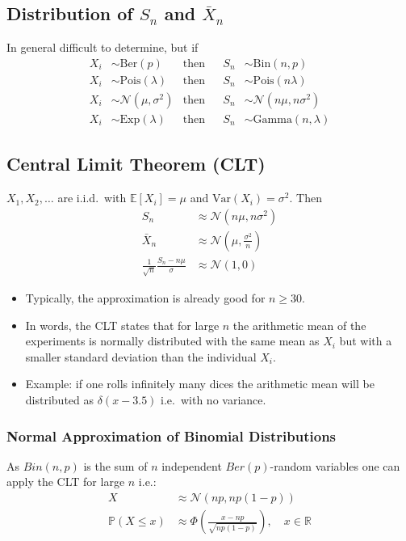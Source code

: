 \subsection[LLN Examples]{Distribution of $S_n$ and $\bar{X}_n$}
In general difficult to determine, but if
\noindent\begin{align*}
    X_i & \sim \mathrm{Ber}(p)            & \text{then} &  & S_n & \sim \mathrm{Bin}(n,p)            \\
    X_i & \sim \mathrm{Pois}(\lambda)     & \text{then} &  & S_n & \sim \mathrm{Pois}(n\lambda)      \\
    X_i & \sim \mathcal{N}(\mu, \sigma^2) & \text{then} &  & S_n & \sim \mathcal{N}(n\mu, n\sigma^2) \\
    X_i & \sim \mathrm{Exp}(\lambda)      & \text{then} &  & S_n & \sim \mathrm{Gamma}(n, \lambda)
\end{align*}

\subsection{Central Limit Theorem (CLT)}
$X_1, X_2, \ldots$ are i.i.d.\ with $\mathbb{E}[X_i]=\mu$ and $\mathrm{Var}(X_i)=\sigma^2$. Then
\begin{align*}
    S_n                                       & \approx \mathcal{N}(n\mu, n\sigma^2)         \\
    \bar{X}_n                                 & \approx \mathcal{N}(\mu, \frac{\sigma^2}{n}) \\
    \frac{1}{\sqrt{n}}\frac{S_n-n\mu}{\sigma} & \approx\mathcal{N}(1,0)
\end{align*}


\begin{itemize}
    \item Typically, the approximation is already good for $n \geq 30$.
    \item In words, the CLT states that for large $n$ the arithmetic mean of the experiments is normally distributed with the same mean as $X_i$ but with a smaller standard deviation than the individual $X_i$.
    \item Example: if one rolls infinitely many dices the arithmetic mean will be distributed as $\delta(x-3.5)$ i.e.\ with no variance.
\end{itemize}
\subsubsection{Normal Approximation of Binomial Distributions}
As $Bin(n,p)$ is the sum of $n$ independent $Ber(p)$-random variables one can apply the CLT for large $n$ i.e.:
\begin{align*}
    X                   & \approx\mathcal{N}(np,np(1-p))                                           \\
    \mathbb{P}(X\leq x) & \approx\Phi\left(\frac{x-np}{\sqrt{np(1-p)}}\right),\quad x\in\mathbb{R}
\end{align*}
